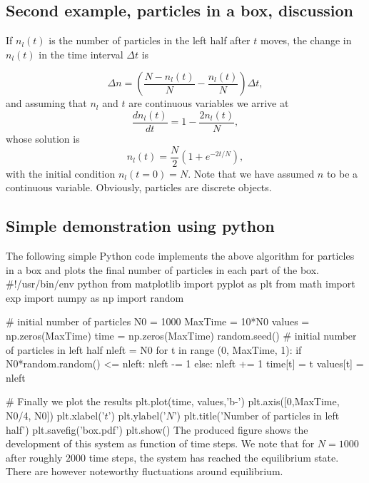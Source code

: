 \documentclass[%
oneside,                 %
final,                   %
10pt]{article}
\newenvironment{block_mdfboxadmon}[1][]{
\begin{block_mdfboxmdframed}[frametitle=#1]
}
{
\end{block_mdfboxmdframed}
}
\begin{document}
\subsection{Second example, particles in a box, discussion}

\begin{block_mdfboxadmon}[]
If $n_l(t)$ is the number of particles in the left half after 
$t$ moves, the change in $n_l(t)$ in the time interval $\Delta t$
is

\begin{equation*}
    \Delta n=\left(\frac{N-n_l(t)}{N}-\frac{n_l(t)}{N}\right)\Delta t,
\end{equation*}
and assuming that $n_l$ and $t$ are continuous variables we arrive at
\begin{equation*}
\frac{dn_l(t)}{dt}=1-\frac{2n_l(t)}{N},
\end{equation*}
whose solution is
\begin{equation*}
   n_l(t)=\frac{N}{2}\left(1+e^{-2t/N}\right),
\end{equation*}
with the initial condition $n_l(t=0)=N$. Note that we have assumed $n$ to be a continuous variable. Obviously, particles are discrete objects.
\end{block_mdfboxadmon} %



\subsection{Simple demonstration using python}

\begin{block_mdfboxadmon}[]
The following simple Python code implements the above algorithm for particles in a box and plots the final number of particles in each part of the box.
\bpypro
#!/usr/bin/env python
from  matplotlib import pyplot as plt
from math import exp
import numpy as np
import random

# initial number of particles
N0 = 1000
MaxTime = 10*N0
values = np.zeros(MaxTime)   
time = np.zeros(MaxTime)   
random.seed() 
# initial number of particles in left half
nleft = N0
for t in range (0, MaxTime, 1):
    if N0*random.random() <= nleft: 
       nleft -= 1
    else: 
       nleft += 1
    time[t] = t
    values[t] = nleft

# Finally we plot the results
plt.plot(time, values,'b-')
plt.axis([0,MaxTime, N0/4, N0])
plt.xlabel('$t$')
plt.ylabel('$N$')
plt.title('Number of particles in left half')
plt.savefig('box.pdf')
plt.show()
\epypro
The produced figure  shows the development of this system as 
function of time steps. We note that for $N=1000$ 
after roughly $2000$ time steps,
the system has reached the equilibrium state. There are however noteworthy
fluctuations around equilibrium.
\end{block_mdfboxadmon} %
\end{document}
